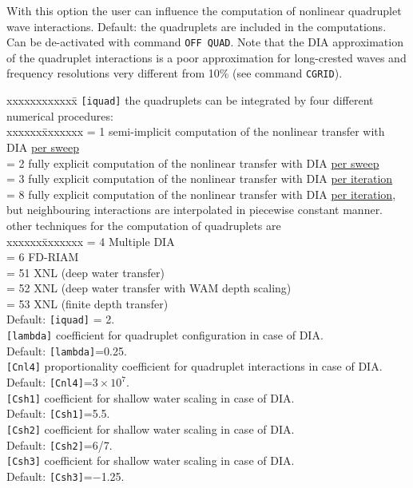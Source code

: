 \documentclass[12pt]{book}
\begin{document}
\noindent
With this option the user can influence the computation of nonlinear quadruplet wave interactions. Default: the quadruplets are included
in the computations. Can be de-activated with command {\tt OFF QUAD}. Note that the DIA approximation of the quadruplet interactions
is a poor approximation for long-crested waves and frequency resolutions very different from 10\% (see command {\tt CGRID}).
\begin{tabbing}
xxxxxxxxxxxx\= \kill
{\tt [iquad]}  \> the quadruplets can be integrated by four different numerical procedures:\+\\
                  \pushtabs
                  xxxxxx\=xxxxxxx \kill
                  = 1 \> semi-implicit computation of the nonlinear transfer with DIA \underline{per sweep}\\
                  = 2 \> fully explicit computation of the nonlinear transfer with DIA \underline{per sweep}\\
                  = 3 \> fully explicit computation of the nonlinear transfer with DIA \underline{per iteration}\\
                  = 8 \> fully explicit computation of the nonlinear transfer with DIA \underline{per iteration},\+\\
                         but neighbouring interactions are interpolated in piecewise constant manner.\-\\
                  \poptabs
                  other techniques for the computation of quadruplets are\\
                  \pushtabs
                  xxxxxx\=xxxxxxx \kill
                  = 4  \> Multiple DIA\\
                  = 6  \> FD-RIAM\\
                  = 51 \> XNL (deep water transfer)\\
                  = 52 \> XNL (deep water transfer with WAM depth scaling)\\
                  = 53 \> XNL (finite depth transfer)\\
                  \poptabs
                  Default: {\tt [iquad]} = 2.\-\\
{\tt [lambda]} \> coefficient for quadruplet configuration in case of DIA.\+\\
                  Default: {\tt [lambda]}=0.25.\-\\
{\tt [Cnl4]}   \> proportionality coefficient for quadruplet interactions in case of DIA.\+\\
                  Default: {\tt [Cnl4]}=$3 \times 10^7$.\-\\
{\tt [Csh1]}   \> coefficient for shallow water scaling in case of DIA.\+\\
                  Default: {\tt [Csh1]}=5.5.\-\\
{\tt [Csh2]}   \> coefficient for shallow water scaling in case of DIA.\+\\
                  Default: {\tt [Csh2]}=6/7.\-\\
{\tt [Csh3]}   \> coefficient for shallow water scaling in case of DIA.\+\\
                  Default: {\tt [Csh3]}=$-$1.25.\-\\
\end{tabbing}
\end{document}
